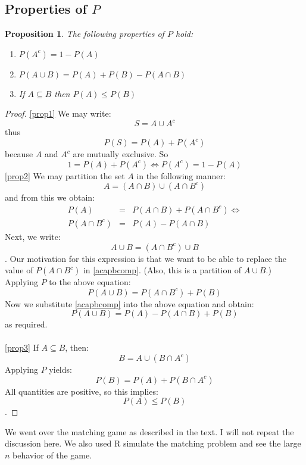 \documentclass[12pt]{article} %
\newtheorem{prop}{Proposition}
\begin{document}
\subsection{Properties of $P$}
\begin{prop}
The following properties of $P$ hold:
\begin{enumerate}
\item $P(A^c) = 1-P(A)$ \label{prop1}
\item $P(A\cup B) = P(A) + P(B)-P(A\cap B)$ \label {prop2}
\item If $A\subseteq B$ then $P(A)\leq P(B)$ \label{prop3}
\end{enumerate}
\end{prop}
\begin{proof}
\ref{prop1} We may write:
$$S = A\cup A^c$$
thus
$$P(S) = P(A) + P(A^c)$$
because $A$ and $A^c$ are mutually exclusive. So
$$1= P(A)+P(A^c)\iff P(A^c) = 1-P(A)$$ 
\ref{prop2} We may partition the set $A$ in the following manner:
$$A= \left(A\cap B\right)\cup\left(A\cap B^c\right)$$
and from this we obtain:
\begin{eqnarray}
P(A) &=& P(A\cap B) + P(A\cap B^c) \iff \nonumber\\
P(A\cap B^c) &=& P(A) - P(A\cap B) \label{acapbcomp} 
\end{eqnarray}
Next, we write:
$$A\cup B = \left(A\cap B^c\right) \cup B$$.
Our motivation for this expression is that we want to be able to replace the value of $P(A\cap B^c)$ in \eqref{acapbcomp}. (Also, this is a partition of $A\cup B$.) Applying $P$ to the above equation:
$$P(A\cup B) = P(A\cap B^c) + P(B)$$
Now we substitute \eqref{acapbcomp} into the above equation and obtain:
$$P(A\cup B) = P(A) - P(A\cap B) + P(B)$$
as required.\\\\
\ref{prop3} If $A\subseteq B$, then:
$$B = A\cup\left(B\cap A^c\right)$$
Applying $P$ yields:
$$P(B) = P(A) + P(B\cap A^c)$$
All quantities are positive, so this implies:
$$P(A)\leq P(B)$$.
\end{proof}

We went over the matching game as described in the text. I will not repeat the discussion here. We also used R simulate the matching problem and see the large $n$ behavior of the game.
\end{document}
